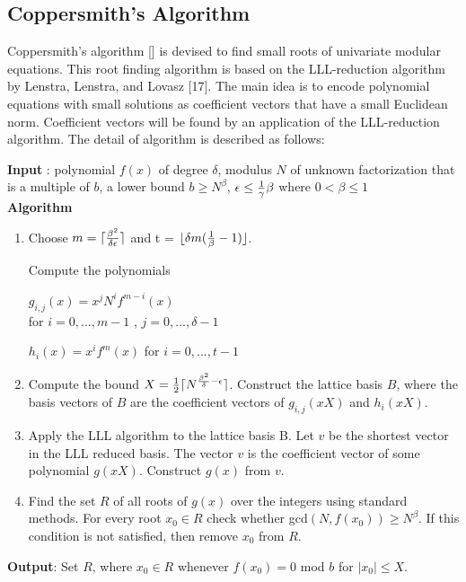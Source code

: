 \documentclass[a4paper]{article}
\begin{document}
\subsection{Coppersmith's Algorithm}
Coppersmith's algorithm [] is devised to find small roots of univariate modular equations. This root finding algorithm is based on the LLL-reduction algorithm by Lenstra, Lenstra, and Lovasz [17]. The main idea is to encode polynomial equations with small solutions as coefficient vectors that have a small Euclidean norm. Coefficient vectors will be found by an application of the LLL-reduction algorithm.
The detail of algorithm is described as follows:

\textbf{Input} : polynomial $f(x)$ of degree $\delta$, modulus $N$ of unknown factorization that is a multiple of $b$, a lower bound $b \geq N^{\beta}$, $\epsilon \leq {1 \over \gamma} \beta$ where $0<\beta \leq 1$
\\

\textbf{Algorithm}
\begin{enumerate}[label=(\roman*)]
      \item Choose $m=\lceil {\beta^2 \over \delta \epsilon} \rceil$ and t = $\lfloor \delta m ({1 \over \beta}-1) \rfloor$. 
      
      Compute the polynomials 
      
      $g_{i,j} (x) = x^j N^i f^{m-i} (x)$ \\ for $i=0,...,m-1$ ,  $j=0,...,\delta-1$
      
      $h_i(x) = x^i f^m (x)$ for $i=0,...,t-1$
      \item Compute the bound $ X= {1 \over 2} \lceil N^{{\beta^2 \over \delta} - \epsilon} \rceil$. Construct the lattice basis $B$, where the basis vectors of $B$ are the coefficient vectors of $g_{i,j}(xX)$ and $h_i(xX)$.
      \item Apply the LLL algorithm to the lattice basis B. Let $v$ be the shortest vector in the LLL reduced basis. The vector $v$ is the coefficient vector of some polynomial $g(xX)$. Construct $g(x)$ from $v$.
      \item Find the set $R$ of all roots of $g(x)$ over the integers using standard methods. For every root $x_0 \in R$ check whether gcd$(N,f(x_0)) \geq N^{\beta}$. If this condition is not satisfied, then remove $x_0$ from $R$.
\end{enumerate} 

\textbf{Output}: Set $R$, where $x_0 \in R$ whenever $f(x_0)=0$ mod $b$ for $|x_0| \leq X$.
\\
\end{document}
